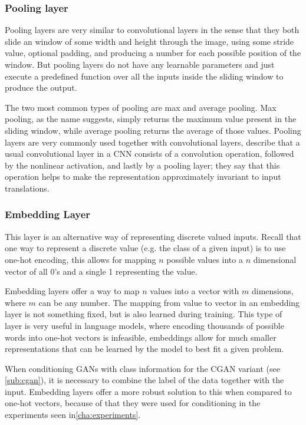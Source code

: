\subsubsection{Pooling layer}
Pooling layers are very similar to convolutional layers in the sense that they both slide an window of some width and height through the image, using some stride value, optional padding, and producing a number for each possible position of the window. But pooling layers do not have any learnable parameters and just execute a predefined function over all the inputs inside the sliding window to produce the output.

The two most common types of pooling are max and average pooling. Max pooling, as the name suggests, simply returns the maximum value present in the sliding window, while average pooling returns the average of those values. Pooling layers are very commonly used together with convolutional layers, \textcite[p. 355-336]{deepLearningBook2016} describe that a usual convolutional layer in a \gls{CNN} consists of a convolution operation, followed by the nonlinear activation, and lastly by a pooling layer; they say that this operation helps to make the representation approximately invariant to input translations.

\subsubsection{Embedding Layer}
This layer is an alternative way of representing discrete valued inputs. Recall that one way to represent a discrete value (e.g. the class of a given input) is to use one-hot encoding, this allows for mapping $n$ possible values into a $n$ dimensional vector of all 0's and a single 1 representing the value.

Embedding layers offer a way to map $n$ values into a vector with $m$ dimensions, where $m$ can be any number. The mapping from value to vector in an embedding layer is not something fixed, but is also learned during training. This type of layer is very useful in language models, where encoding thousands of possible words into one-hot vectors is infeasible, embeddings allow for much smaller representations that can be learned by the model to best fit a given problem.

When conditioning \acp{GAN} with class information for the  \gls{CGAN} variant (see \autoref{sub:cgan}), it is necessary to combine the label of the data together with the input. Embedding layers offer a more robust solution to this when compared to one-hot vectors, because of that they were used for conditioning in the experiments seen in\autoref{cha:experiments}.



